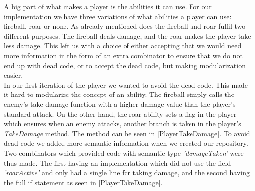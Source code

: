 A big part of what makes a player is the abilities it can use. For our implementation we have three variations of what abilities a player can use: fireball, roar or none. As already mentioned  does the fireball and roar fulfil two different purposes. The fireball deals damage, and the roar makes the player take less damage. This left us with a choice of either accepting that we would need more information in the form of an extra combinator to ensure that we do not end up with dead code, or to accept the dead code, but making modularization  easier.\\
In our first iteration of the player we wanted to avoid the dead code. This made it hard to modularize the concept of an ability. The fireball simply calls the enemy's take damage function with a higher damage value than the player's standard attack. On the other hand, the roar ability sets a flag in the player which ensures when an enemy attacks, another branch is taken in the player's \textit{TakeDamage} method. The method can be seen in \autoref{PlayerTakeDamage}. To avoid dead code we added more semantic information when we created our repository. Two combinators which provided code with semantic type \textit{'damageTaken'} were thus made. The first having an implementation which did not use the field \textit{'roarActive'} and only had a single line for taking damage, and the second having the full if statement as seen in \autoref{PlayerTakeDamage}.

